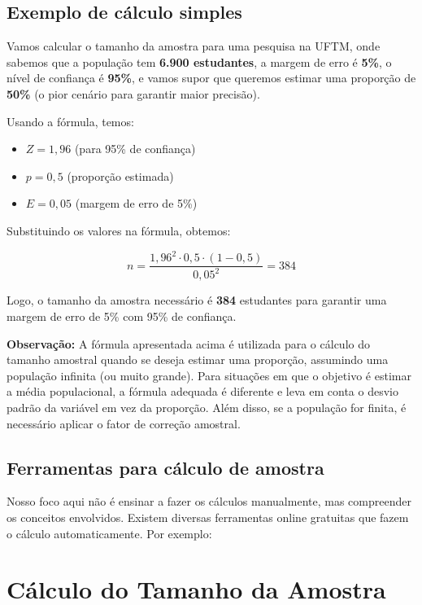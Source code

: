 \documentclass[
]{book}
\providecommand{\tightlist}{%
  \setlength{\itemsep}{0pt}\setlength{\parskip}{0pt}}
\begin{document}
\subsection{Exemplo de cálculo simples}\label{exemplo-de-cuxe1lculo-simples}

Vamos calcular o tamanho da amostra para uma pesquisa na UFTM, onde sabemos que a população tem \textbf{6.900 estudantes}, a margem de erro é \textbf{5\%}, o nível de confiança é \textbf{95\%}, e vamos supor que queremos estimar uma proporção de \textbf{50\%} (o pior cenário para garantir maior precisão).

Usando a fórmula, temos:

\begin{itemize}
\tightlist
\item
  \(Z = 1,96\) (para 95\% de confiança)
\item
  \(p = 0,5\) (proporção estimada)
\item
  \(E = 0,05\) (margem de erro de 5\%)
\end{itemize}

Substituindo os valores na fórmula, obtemos:

\[
n = \frac{{1,96^2 \cdot 0,5 \cdot (1 - 0,5)}}{{0,05^2}} = 384
\]

Logo, o tamanho da amostra necessário é \textbf{384} estudantes para garantir uma margem de erro de 5\% com 95\% de confiança.

\textbf{Observação:} A fórmula apresentada acima é utilizada para o cálculo do tamanho amostral quando se deseja estimar uma proporção, assumindo uma população infinita (ou muito grande). Para situações em que o objetivo é estimar a média populacional, a fórmula adequada é diferente e leva em conta o desvio padrão da variável em vez da proporção. Além disso, se a população for finita, é necessário aplicar o fator de correção amostral.

\subsection{Ferramentas para cálculo de amostra}\label{ferramentas-para-cuxe1lculo-de-amostra}

Nosso foco aqui não é ensinar a fazer os cálculos manualmente, mas compreender os conceitos envolvidos. Existem diversas ferramentas online gratuitas que fazem o cálculo automaticamente. Por exemplo:

\section{Cálculo do Tamanho da Amostra}\label{cuxe1lculo-do-tamanho-da-amostra}
\end{document}

